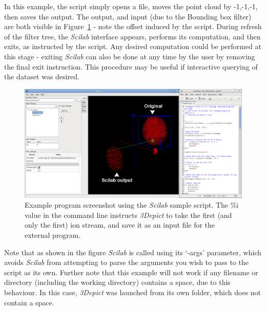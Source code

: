 \documentclass[10pt]{article}
\begin{document}
In this example, the script simply opens a file, moves the point cloud by -1,-1,-1, then saves the output. The output, and input (due to the Bounding box filter) are both visible in Figure~\ref{fig:externalProgScilabSample} - note the offset induced by the script. During refresh of the filter tree, the \emph{Scilab} interface appears, performs its computation, and then exits, as instructed by the script. Any desired computation could be performed at this stage - exiting \emph{Scilab} can also be done at any time by the user by removing the final exit instruction. This procedure may be useful if interactive querying of the dataset was desired.

\begin{figure}
\begin{center}
 \includegraphics[keepaspectratio=true,width=0.9 \textwidth]{./figures/externalProgScilab.png}
 \caption{Example program screenshot using the \emph{Scilab} sample script. The \%i value in the command line instructs \emph{3Depict} to take the first (and only the first) ion stream, and save it as an input file for the external program. }
 \label{fig:externalProgScilabSample}
\end{center}
\end{figure}

Note that as shown in the figure \emph{Scilab} is called using its `-args' parameter, which avoids \emph{Scilab} from attempting to parse the arguments you wish to pass to the script as its own. Further note that this example will not work if any filename or directory (including the working directory) contains a space, due to this behaviour. In this case, \emph{3Depict} was launched from its own folder, which does not contain a space.
\end{document}

